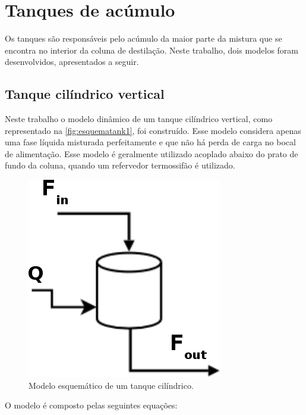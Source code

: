 \section{Tanques de acúmulo}
Os tanques são responsáveis pelo acúmulo da maior parte da mistura que
se encontra no interior da coluna de destilação.
Neste trabalho, dois modelos foram desenvolvidos, apresentados a seguir.

\subsection{Tanque cilíndrico vertical} \label{sec:modelotanquecilindrico}
Neste trabalho o modelo dinâmico de um tanque cilíndrico vertical, como
representado na \autoref{fig:esquematank1}, foi construído.
Esse modelo considera apenas uma fase líquida misturada perfeitamente e que não
há perda de carga no bocal de alimentação.
Esse modelo é geralmente utilizado acoplado abaixo do prato de fundo da coluna, quando um refervedor termossifão é utilizado.

\begin{figure}[htb]
\centering \includegraphics[scale=0.5]{images/Chap3/esquematank2.png}
\caption{Modelo esquemático de um tanque cilíndrico.}
\label{fig:esquematank1}
\end{figure}
O modelo é composto pelas seguintes equações:

